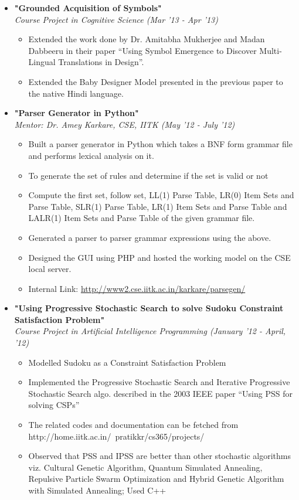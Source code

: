 \documentclass[margin,line]{resume}
\begin{document}
\begin{resume}
\begin{itemize}
  \item \large{\textbf{\textsf{"Grounded Acquisition of Symbols"}}}
    \\ \small{\textit{Course Project in Cognitive Science (Mar '13 - Apr '13)}}
    \normalsize
    \begin{itemize}
    \item Extended the work done by Dr. Amitabha Mukherjee and Madan Dabbeeru in their paper ``Using Symbol Emergence to Discover Multi-Lingual Translations in Design''.
    \item Extended the Baby Designer Model presented in the previous paper to the native Hindi language.
    \end{itemize}

  \item \large{\textbf{\textsf{"Parser Generator in Python"}}}
    \\ \small{\textit{Mentor: Dr. Amey Karkare, CSE, IITK (May '12 - July '12)}}
    \normalsize
    \begin{itemize}
      \item Built a parser generator in Python which takes a BNF form grammar file and performs lexical analysis on it.
      \item To generate the set of rules and determine if the set is valid or not
      \item Compute the first set, follow set, LL(1) Parse Table, LR(0) Item Sets and Parse Table, SLR(1) Parse Table, LR(1) Item Sets and Parse Table and LALR(1) Item Sets and Parse Table of the given grammar file.
      \item Generated a parser to parser grammar expressions using the above.
      \item Designed the GUI using PHP and hosted the working model on the CSE local server. 
      \item Internal Link: \url{http://www2.cse.iitk.ac.in/karkare/parsegen/}
    \end{itemize}

  \item \large{\textbf{\textsf{"Using Progressive Stochastic Search to solve Sudoku Constraint Satisfaction Problem"}}}
    \\ \small{\textit{Course Project in Artificial Intelligence Programming (January '12 - April, '12)}}
    \normalsize
    \begin{itemize}
    \item Modelled Sudoku as a Constraint Satisfaction Problem
    \item Implemented the Progressive Stochastic Search and Iterative Progressive Stochastic Search algo. described in the 2003 IEEE paper ``Using PSS for solving CSPs''
    \item The related codes and documentation can be fetched from http://home.iitk.ac.in/~pratikkr/cs365/projects/
    \item  Observed that PSS and IPSS are better than other stochastic algorithms viz. Cultural Genetic Algorithm, Quantum Simulated Annealing, Repulsive Particle Swarm Optimization and Hybrid Genetic Algorithm with Simulated Annealing; Used C++
    \end{itemize}
    

\end{itemize}
\end{resume}
\end{document}
